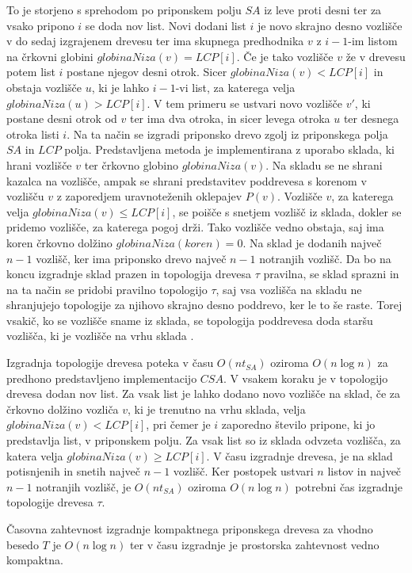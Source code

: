 To je storjeno s sprehodom po priponskem polju $SA$ iz leve proti desni ter za vsako pripono $i$ se doda nov list. Novi dodani list $i$ je novo skrajno desno vozlišče v do sedaj izgrajenem drevesu ter ima skupnega predhodnika $v$ z $i-1$-im listom na črkovni globini $globinaNiza(v)=LCP[i]$. Če je tako vozlišče $v$ že v drevesu potem list $i$ postane njegov desni otrok. Sicer $globinaNiza(v)<LCP[i]$ in obstaja vozlišče $u$, ki je lahko $i-1$-vi list, za katerega velja $globinaNiza(u)>LCP[i]$. V tem primeru se ustvari novo vozlišče $v'$, ki postane desni otrok od $v$ ter ima dva otroka, in sicer levega otroka $u$ ter desnega otroka listi $i$. Na ta način se izgradi priponsko drevo zgolj iz priponskega polja $SA$ in $LCP$ polja. Predstavljena metoda je implementirana z uporabo sklada, ki hrani vozlišče $v$ ter črkovno globino $globinaNiza(v)$. Na skladu se ne shrani kazalca na vozlišče, ampak se shrani predstavitev poddrevesa s korenom v vozlišču $v$ z zaporedjem uravnoteženih oklepajev $P(v)$. Vozlišče $v$, za katerega velja $globinaNiza(v)\le LCP[i]$, se poišče s snetjem vozlišč iz sklada, dokler se pridemo vozlišče, za katerega pogoj drži. Tako vozlišče vedno obstaja, saj ima koren črkovno dolžino $globinaNiza(koren)=0$. Na sklad je dodanih največ $n-1$ vozlišč, ker ima priponsko drevo največ $n-1$ notranjih vozlišč. Da bo na koncu izgradnje sklad prazen in topologija drevesa $\tau$ pravilna, se sklad sprazni in na ta način se pridobi pravilno topologijo $\tau$, saj vsa vozlišča na skladu ne shranjujejo topologije za njihovo skrajno desno poddrevo, ker le to še raste. Torej vsakič, ko se vozlišče sname iz sklada, se topologija poddrevesa doda staršu vozlišča, ki je vozlišče na vrhu sklada \cite{Navarro2016}.

Izgradnja topologije drevesa poteka v času $O(nt_{SA})$ oziroma $O(n\log{n})$ za predhono predstavljeno implementacijo $CSA$. V vsakem koraku je v topologijo drevesa dodan nov list. Za vsak list je lahko dodano novo vozlišče na sklad, če za črkovno dolžino vozliča $v$, ki je trenutno na vrhu sklada, velja $globinaNiza(v)<LCP[i]$, pri čemer je  $i$ zaporedno število pripone, ki jo predstavlja list, v priponskem polju. Za vsak list so iz sklada odvzeta vozlišča, za katera velja $globinaNiza(v)\ge LCP[i]$. V času izgradnje drevesa, je na sklad potisnjenih in snetih največ $n-1$ vozlišč. Ker postopek ustvari $n$ listov in največ $n-1$ notranjih vozlišč, je $O(nt_{SA})$ oziroma $O(n\log{n})$ potrebni čas izgradnje topologije drevesa $\tau$.

\begin{izr} \label{izr:izgradnjaCST}
    Časovna zahtevnost izgradnje kompaktnega priponskega drevesa za vhodno besedo $T$ je $O(n\log{n})$ ter v času izgradnje je prostorska zahtevnost vedno kompaktna.
\end{izr}


